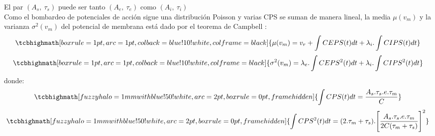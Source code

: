 El par $(A_s,\ \tau_s)$ puede ser tanto $(A_e,\ \tau_e)$ como $(A_i,\ \tau_i)$ \\
Como el bombardeo de potenciales de acción sigue una distribución Poisson y varias CPS se suman de manera lineal, la media $\mu(v_m)$ y la varianza $\sigma^2(v_m)$ del potencial de membrana está dado por el teorema de Campbell \cite{papoulis1991probability}:
\begin{equation}
    \tcbhighmath[boxrule=1pt,arc=1pt,colback=blue!10!white,colframe=black]{\mu(v_m)=v_r+\int CEPS(t) dt+ \lambda_i.\int CIPS(t) dt}
\end{equation}
\begin{equation}
    \tcbhighmath[boxrule=1pt,arc=1pt,colback=blue!10!white,colframe=black]{
    \sigma^2(v_m)=\lambda_e.\int CEPS^2(t) dt + \lambda_i.\int CIPS^2(t) dt
    }
\end{equation}
donde:
\[
    \tcbhighmath[fuzzy halo=1mm with blue!50!white,arc=2pt,
  boxrule=0pt,frame hidden]{\int CPS(t)dt= \frac{A_s.\tau_s.e.\tau_m}{C}}
  \]
 \[
    \tcbhighmath[fuzzy halo=1mm with blue!50!white,arc=2pt,
  boxrule=0pt,frame hidden]{\int CPS^2(t)dt= (2.\tau_m + \tau_s).\Bigg[\frac{A_s.\tau_s.e.\tau_m}{2C(\tau_m+\tau_s)}\Bigg]^2}
  \]
  